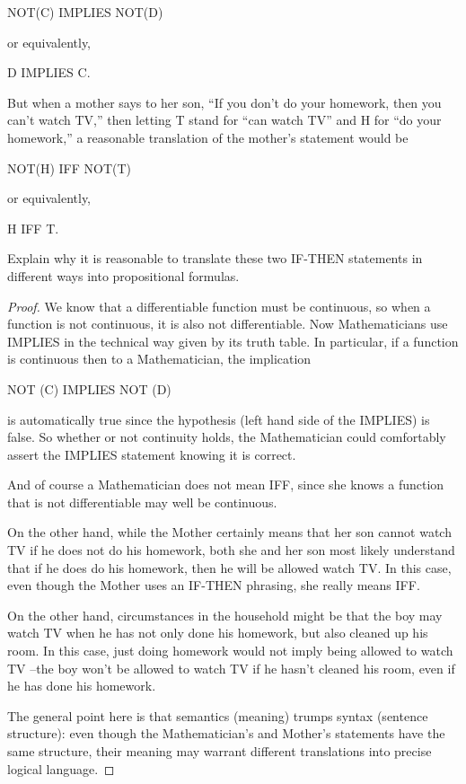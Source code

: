 \documentclass[14pt]{extarticle}
\begin{document}
\begin{center}
NOT(C) IMPLIES NOT(D)
\end{center}

or equivalently,

\begin{center}
D IMPLIES C.
\end{center}

But when a mother says to her son, “If you don’t do your homework, then you can’t watch TV,” then letting T stand for “can watch TV” and H for “do your homework,” a reasonable translation of the mother’s statement would be

\begin{center}
NOT(H) IFF NOT(T)
\end{center}

or equivalently,

\begin{center}
H IFF T.
\end{center}

Explain why it is reasonable to translate these two IF-THEN statements in different ways into propositional formulas.

\begin{proof}
We know that a differentiable function must be continuous, so when a function is not continuous, it is also not differentiable. Now Mathematicians use IMPLIES in the technical way given by its truth table. In particular, if a function is continuous then to a Mathematician, the implication

\begin{center}
NOT (C) IMPLIES NOT (D)
\end{center}

is automatically true since the hypothesis (left hand side of the IMPLIES) is false. So whether or not continuity holds, the Mathematician could comfortably assert the IMPLIES statement knowing it is correct.

And of course a Mathematician does not mean IFF, since she knows a function that is not differen­tiable may well be continuous.

On the other hand, while the Mother certainly means that her son cannot watch TV if he does not do his homework, both she and her son most likely understand that if he does do his homework,
then he will be allowed watch TV. In this case, even though the Mother uses an IF-THEN phrasing, she really means IFF.

On the other hand, circumstances in the household might be that the boy may watch TV when he has not only done his homework, but also cleaned up his room. In this case, just doing homework would not imply being allowed to watch TV –the boy won’t be allowed to watch TV if he hasn’t cleaned his room, even if he has done his homework.

The general point here is that semantics (meaning) trumps syntax (sentence structure): even though the Mathematician’s and Mother’s statements have the same structure, their meaning may warrant different translations into precise logical language.
\end{proof}
\end{document}
